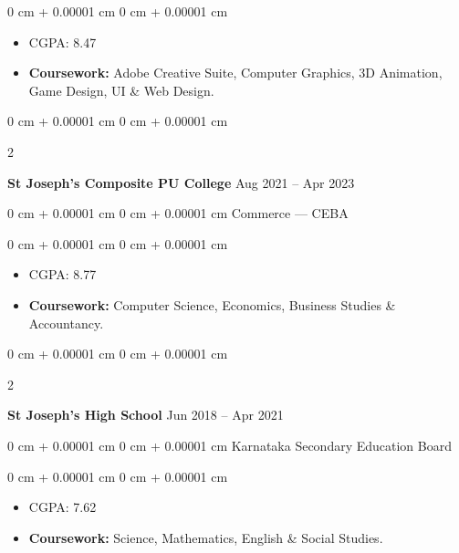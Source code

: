 \documentclass[10pt, letterpaper]{article}
\newenvironment{highlights}{
   \begin{itemize}[
        topsep=0.10 cm,
        parsep=0.10 cm,
        partopsep=0pt,
        itemsep=0pt
    ]
    \addtolength{\leftskip}{-0.5em} %
}{
    \end{itemize}
} %
\newenvironment{onecolentry}{
    \begin{adjustwidth}{
        0 cm + 0.00001 cm
    }{
        0 cm + 0.00001 cm
    }
}{
    \end{adjustwidth}
} %
\newenvironment{twocolentry}[2][]{
    \onecolentry
    \def\secondColumn{#2}
    \setcolumnwidth{\fill, 4.5 cm}
    \begin{paracol}{2}
}{
    \switchcolumn \raggedleft \secondColumn
    \end{paracol}
    \endonecolentry
} %
\begin{document}
        \vspace{0.10 cm}
        \begin{onecolentry}
            \begin{highlights}
                \item CGPA: 8.47
                \item \textbf{Coursework:} Adobe Creative Suite, Computer Graphics, 3D Animation, Game Design, UI \& Web Design.

            \end{highlights}
        \end{onecolentry}

        \vspace{0.3 cm}
        
        \begin{twocolentry}{
            Aug 2021 – Apr 2023
        }
            \textbf{St Joseph’s Composite PU College}\end{twocolentry}
            \begin{onecolentry} Commerce — CEBA \end{onecolentry}

        \vspace{0.10 cm}
        \begin{onecolentry}
            \begin{highlights}
                \item CGPA: 8.77
                \item \textbf{Coursework:} Computer Science, Economics, Business Studies \& Accountancy.
            \end{highlights}
        \end{onecolentry}

    \vspace{0.3 cm}

        \begin{twocolentry}{
            Jun 2018 – Apr 2021
        }
            \textbf{St Joseph’s High School}\end{twocolentry}
            \begin{onecolentry} Karnataka Secondary Education Board \end{onecolentry}

        \vspace{0.10 cm}
        \begin{onecolentry}
            \begin{highlights}
                \item CGPA: 7.62
                \item \textbf{Coursework:} Science, Mathematics, English \& Social Studies.
            \end{highlights}
        \end{onecolentry}
\end{document}
